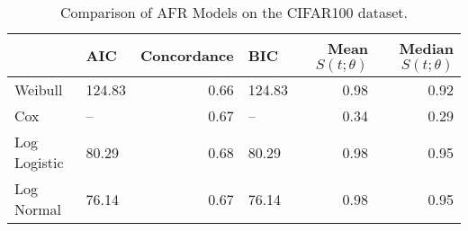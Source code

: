 \begin{table*}
\caption{Comparison of AFR Models on the CIFAR100 dataset.}
\label{tab:cifar100}
\begin{tabular}{llrlrr}
\toprule
 & AIC & Concordance & BIC & Mean $S(t;\theta)$ & Median $S(t; \theta)$ \\
\midrule
Weibull & 124.83 & 0.66 & 124.83 & 0.98 & 0.92 \\
Cox & -- & 0.67 & -- & 0.34 & 0.29 \\
Log Logistic & 80.29 & 0.68 & 80.29 & 0.98 & 0.95 \\
Log Normal & 76.14 & 0.67 & 76.14 & 0.98 & 0.95 \\
\bottomrule
\end{tabular}
\end{table*}
